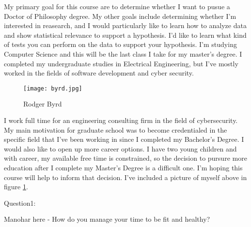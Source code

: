 My primary goal for this course are to determine whether I want to pusue a Doctor of Philosophy degree. My other goals include determining whether I'm interested in reasearch, and I would particularly like to learn how to analyze data and show statistical relevance to support a hypothesis. I'd like to learn what kind of tests you can perform on the data to support your hypothesis. I'm studying Computer Science and this will be the last class I take for my master's degree. I completed my undergraduate studies in Electrical Engineering, but I've mostly worked in the fields of software development and cyber security.
\begin{figure}
  \centerline{\texttt{[image: byrd.jpg]}}
  \caption{Rodger Byrd}
  \label{fig:HS}
\end{figure} 
I work full time for an engineering consulting firm in the field of cybersecurity. My main motivation for graduate school was to become credentialed in the specific field that I've been working in since I completed my Bachelor's Degree. I would also like to open up more career options. I have two young children and with career, my available free time is constrained, so the decision to pursure more education after I complete my Master's Degree is a difficult one. I'm hoping this course will help to inform that decision. I've included a picture of myself above in figure \ref{fig:HS}.


Question1: 

Manohar here - How do you manage your time to be fit and healthy?
